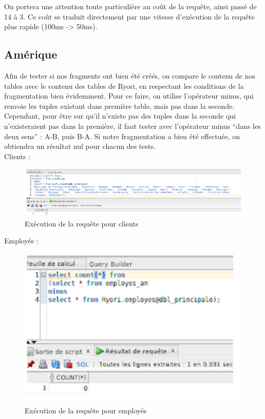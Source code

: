 \documentclass[10pt,a4paper]{article}
\theoremstyle{plain}
\begin{document}
On portera une attention toute particulière au coût de la requête, ainsi passé de 14 à 3. Ce coût se traduit directement par une vitesse d'exécution de la requête plus rapide (100ms -> 50ms).

\newpage

\subsection{Amérique}
Afin de tester si nos fragments ont bien été créés, on compare le contenu de nos tables avec le contenu des tables de Ryori, en respectant les conditions de la fragmentation bien évidemment. Pour ce faire, on utilise l’opérateur minus, qui renvoie les tuples existant dans première table, mais pas dans la seconde. Cependant, pour être sur qu’il n’existe pas des tuples dans la seconde qui n’existeraient pas dans la première, il faut tester avec l’opérateur minus “dans les deux sens” : A-B, puis B-A. Si notre fragmentation a bien été effectuée, on obtiendra un résultat nul pour chacun des tests.\\

Clients :\\
\begin{figure}[H]
	\centering
	\includegraphics[width=15cm]{AM_req1.png}
	\caption{Exécution de la requête pour clients}
\end{figure}

Employés :\\
\begin{figure}[H]
	\centering
	\includegraphics[width=15cm]{AM_req2.png}
	\caption{Exécution de la requête pour employés}
\end{figure}
\end{document}
